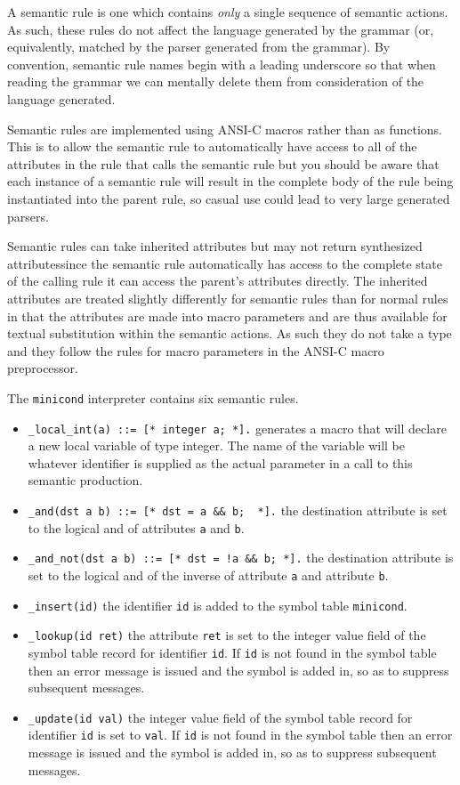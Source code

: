 A semantic rule is one which contains {\em only} a single sequence of semantic actions. As
such, these rules do not affect the language generated by the grammar
(or, equivalently, matched by the parser generated from the grammar). By
convention, semantic rule names begin with a leading underscore so that
when reading the grammar we can mentally delete them from consideration
of the language generated. 

Semantic rules are implemented using ANSI-C macros rather than as
functions. This is to allow the semantic rule to automatically have
access to all of the attributes in the rule that calls the semantic
rule but you should be aware that each instance of a semantic rule will result
in the complete body of the rule being instantiated into the parent rule, so casual
use could lead to very large generated parsers.

Semantic rules can take inherited attributes but may not return
synthesized attributes\dash since the semantic rule automatically has
access to the complete state of the calling rule it can access the
parent's attributes directly. The inherited attributes are treated
slightly differently for semantic rules than for normal rules in that
the attributes are made into macro parameters and are thus available for
textual substitution within the semantic actions. As such they do not
take a type and they follow the rules for macro parameters in the ANSI-C
macro preprocessor.

The {\tt minicond} interpreter contains six semantic
rules. 
\begin{itemize}
\item \verb+_local_int(a) ::= [* integer a; *].+ generates a macro that will declare a
new local variable of type integer. The name of the variable will be whatever identifier
is supplied as the actual parameter in a call to this semantic production.
\item \verb+_and(dst a b) ::= [* dst = a && b;  *].+ the destination attribute is set
to the logical {\sc and} of attributes {\tt a} and {\tt b}.
\item \verb+_and_not(dst a b) ::= [* dst = !a && b; *].+ the destination attribute is set
to the logical {\sc and} of the inverse of attribute {\tt a} and attribute {\tt b}.
\item \verb+_insert(id)+ the identifier {\tt id} is added to the symbol table {\tt minicond}.
\item \verb+_lookup(id ret)+ the attribute {\tt ret} is set to the integer value field of
the symbol table record for identifier {\tt id}. If {\tt id} is not found in the symbol
table then an error message is issued and the symbol is added in, so as to suppress
subsequent messages.
\item \verb+_update(id val)+ the integer value field of
the symbol table record for identifier {\tt id} is set to {\tt val}. If {\tt id} is not found in the symbol
table then an error message is issued and the symbol is added in, so as to suppress
subsequent messages.
\end{itemize}

